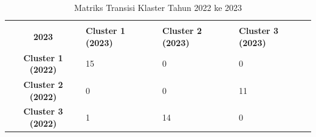 \begin{table}[H]
\centering
\caption{Matriks Transisi Klaster Tahun 2022 ke 2023} \label{tab:transisi_2022_2023}
\begin{tabular}{|c|p{2cm}|p{2cm}|p{2cm}|}
\hline
\makecell{\textbf{Tahun 2022} \\ \textbf{2023}} & \textbf{Cluster 1 (2023)} & \textbf{Cluster 2 (2023)} & \textbf{Cluster 3 (2023)} \\ \hline
\textbf{Cluster 1 (2022)} & 15 & 0 & 0 \\ \hline
\textbf{Cluster 2 (2022)} & 0 & 0 & 11 \\ \hline
\textbf{Cluster 3 (2022)} & 1 & 14 & 0 \\ \hline
\end{tabular}
\end{table}
